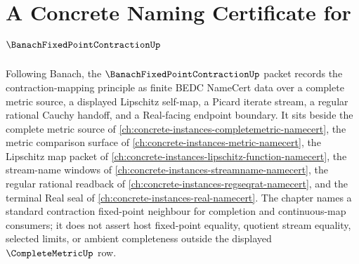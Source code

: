 \chapter{A Concrete Naming Certificate for $\BanachFixedPointContractionUp$}
\label{ch:concrete-instances-banach-fixed-point-contraction-namecert}

Following Banach, the $\BanachFixedPointContractionUp$ packet records the contraction-mapping principle as finite BEDC NameCert data over a complete metric source, a displayed Lipschitz self-map, a Picard iterate stream, a regular rational Cauchy handoff, and a Real-facing endpoint boundary. It sits beside the complete metric source of \autoref{ch:concrete-instances-completemetric-namecert}, the metric comparison surface of \autoref{ch:concrete-instances-metric-namecert}, the Lipschitz map packet of \autoref{ch:concrete-instances-lipschitz-function-namecert}, the stream-name windows of \autoref{ch:concrete-instances-streamname-namecert}, the regular rational readback of \autoref{ch:concrete-instances-regseqrat-namecert}, and the terminal Real seal of \autoref{ch:concrete-instances-real-namecert}. The chapter names a standard contraction fixed-point neighbour for completion and continuous-map consumers; it does not assert host fixed-point equality, quotient stream equality, selected limits, or ambient completeness outside the displayed $\CompleteMetricUp$ row.

